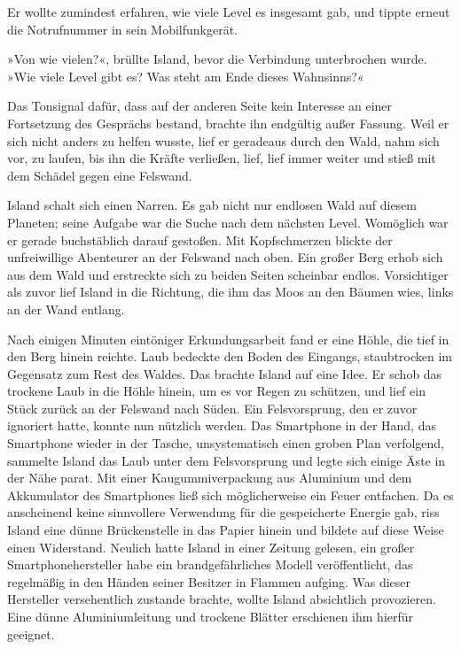 Er wollte zumindest erfahren, wie viele Level es insgesamt gab, und tippte erneut die Notrufnummer in sein Mobilfunkgerät.


»Von wie vielen?«, brüllte Island, bevor die Verbindung unterbrochen wurde. »Wie viele Level gibt es? Was steht am Ende dieses Wahnsinns?«

Das Tonsignal dafür, dass auf der anderen Seite kein Interesse an einer Fortsetzung des Gesprächs bestand, brachte ihn endgültig außer Fassung. Weil er sich nicht anders zu helfen wusste, lief er geradeaus durch den Wald, nahm sich vor, zu laufen, bis ihn die Kräfte verließen, lief, lief immer weiter und stieß mit dem Schädel gegen eine Felswand.

Island schalt sich einen Narren. Es gab nicht nur endlosen Wald auf diesem Planeten; seine Aufgabe war die Suche nach dem nächsten Level. Womöglich war er gerade buchstäblich darauf gestoßen. Mit Kopfschmerzen blickte der unfreiwillige Abenteurer an der Felswand nach oben. Ein großer Berg erhob sich aus dem Wald und erstreckte sich zu beiden Seiten scheinbar endlos. Vorsichtiger als zuvor lief Island in die Richtung, die ihm das Moos an den Bäumen wies, links an der Wand entlang.

Nach einigen Minuten eintöniger Erkundungsarbeit fand er eine Höhle, die tief in den Berg hinein reichte. Laub bedeckte den Boden des Eingangs, staubtrocken im Gegensatz zum Rest des Waldes. Das brachte Island auf eine Idee. Er schob das trockene Laub in die Höhle hinein, um es vor Regen zu schützen, und lief ein Stück zurück an der Felswand nach Süden. Ein Felsvorsprung, den er zuvor ignoriert hatte, konnte nun nützlich werden. Das Smartphone in der Hand, das Smartphone wieder in der Tasche, unsystematisch einen groben Plan verfolgend, sammelte Island das Laub unter dem Felsvorsprung und legte sich einige Äste in der Nähe parat. Mit einer Kaugummiverpackung aus Aluminium und dem Akkumulator des Smartphones ließ sich möglicherweise ein Feuer entfachen. Da es anscheinend keine sinnvollere Verwendung für die gespeicherte Energie gab, riss Island eine dünne Brückenstelle in das Papier hinein und bildete auf diese Weise einen Widerstand. Neulich hatte Island in einer Zeitung gelesen, ein großer Smartphonehersteller habe ein brandgefährliches Modell veröffentlicht, das regelmäßig in den Händen seiner Besitzer in Flammen aufging. Was dieser Hersteller versehentlich zustande brachte, wollte Island absichtlich provozieren. Eine dünne Aluminiumleitung und trockene Blätter erschienen ihm hierfür geeignet.

